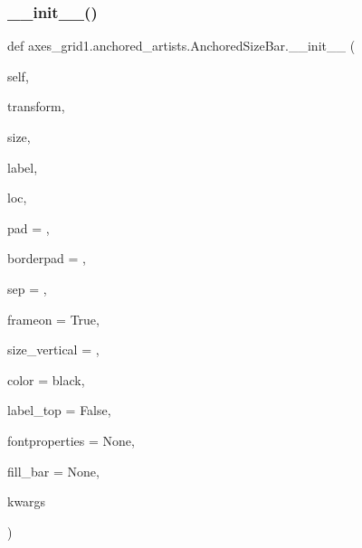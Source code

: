 \subsubsection{\texorpdfstring{\+\_\+\+\_\+init\+\_\+\+\_\+()}{\_\_init\_\_()}}
{\footnotesize\ttfamily def axes\+\_\+grid1.\+anchored\+\_\+artists.\+Anchored\+Size\+Bar.\+\_\+\+\_\+init\+\_\+\+\_\+ (\begin{DoxyParamCaption}\item[{}]{self,  }\item[{}]{transform,  }\item[{}]{size,  }\item[{}]{label,  }\item[{}]{loc,  }\item[{}]{pad = {},  }\item[{}]{borderpad = {},  }\item[{}]{sep = {},  }\item[{}]{frameon = {\ttfamily True},  }\item[{}]{size\+\_\+vertical = {},  }\item[{}]{color = {\ttfamily \textquotesingle{}black\textquotesingle{}},  }\item[{}]{label\+\_\+top = {\ttfamily False},  }\item[{}]{fontproperties = {\ttfamily None},  }\item[{}]{fill\+\_\+bar = {\ttfamily None},  }\item[{}]{kwargs }\end{DoxyParamCaption})}

